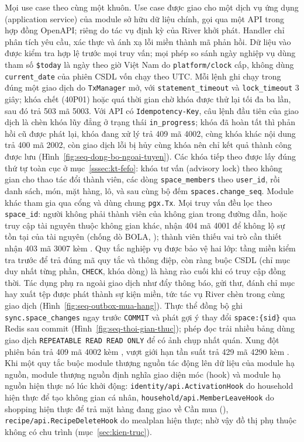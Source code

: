 Mọi use case theo cùng một khuôn. Use case được giao cho một dịch vụ ứng dụng (application service) của module sở hữu dữ liệu chính, gọi qua một API trong hợp đồng OpenAPI; riêng  do tác vụ định kỳ của River khởi phát. Handler chỉ phân tích yêu cầu, xác thực và ánh xạ lỗi miền thành mã phản hồi. Dữ liệu vào được kiểm tra hợp lệ trước mọi truy vấn; mọi phép so sánh ngày nghiệp vụ dùng tham số \texttt{\$today} là ngày theo giờ Việt Nam do \texttt{platform/clock} cấp, không dùng \texttt{current\_date} của phiên CSDL vốn chạy theo UTC. Mỗi lệnh ghi chạy trong đúng một giao dịch do \texttt{TxManager} mở, với \texttt{statement\_timeout} và \texttt{lock\_timeout} 3 giây; khóa chết (40P01) hoặc quá thời gian chờ khóa được thử lại tối đa ba lần, sau đó trả 503 mã 5003. Với API có \texttt{Idempotency-Key}, câu lệnh đầu tiên của giao dịch là chèn khóa lũy đẳng ở trạng thái \texttt{in\_progress}; khóa đã hoàn tất thì phản hồi cũ được phát lại, khóa đang xử lý trả 409 mã 4002, cùng khóa khác nội dung trả 400 mã 2002, còn giao dịch lỗi bị hủy cùng khóa nên chỉ kết quả thành công được lưu (Hình~\ref{fig:seq-dong-bo-ngoai-tuyen}). Các khóa tiếp theo được lấy đúng thứ tự toàn cục ở mục~\ref{sssec:kt-fefo}: khóa tư vấn (advisory lock) theo không gian cho thao tác đổi thành viên, các dòng \texttt{space\_members} theo \texttt{user\_id}, rồi danh sách, món, mặt hàng, lô, và sau cùng bộ đếm \texttt{spaces.change\_seq}. Module khác tham gia qua cổng và dùng chung \texttt{pgx.Tx}. Mọi truy vấn đều lọc theo \texttt{space\_id}: người không phải thành viên của không gian trong đường dẫn, hoặc truy cập tài nguyên thuộc không gian khác, nhận 404 mã 4001 để không lộ sự tồn tại của tài nguyên (chống dò BOLA, ); thành viên thiếu vai trò cần thiết nhận 403 mã 3007 kèm . Quy tắc nghiệp vụ được bảo vệ hai lớp: tầng miền kiểm tra trước để trả đúng mã quy tắc và thông điệp, còn ràng buộc CSDL (chỉ mục duy nhất từng phần, \texttt{CHECK}, khóa dòng) là hàng rào cuối khi có truy cập đồng thời. Tác dụng phụ ra ngoài giao dịch như đẩy thông báo, gửi thư, đánh chỉ mục hay xuất tệp được phát thành sự kiện miền, tức tác vụ River chèn trong cùng giao dịch (Hình~\ref{fig:seq-outbox-mua-hang}). Thực thể đồng bộ ghi \texttt{sync.space\_changes} ngay trước \texttt{COMMIT} và phát gợi ý thay đổi \texttt{space:\{sid\}} qua Redis sau commit (Hình~\ref{fig:seq-thoi-gian-thuc}); phép đọc trải nhiều bảng dùng giao dịch \texttt{REPEATABLE READ READ ONLY} để có ảnh chụp nhất quán. Xung đột phiên bản trả 409 mã 4002 kèm , vượt giới hạn tần suất trả 429 mã 4290 kèm . Khi một quy tắc buộc module thượng nguồn tác động lên dữ liệu của module hạ nguồn, module thượng nguồn định nghĩa giao diện móc (hook) và module hạ nguồn hiện thực nó lúc khởi động: \texttt{identity/api.ActivationHook} do household hiện thực để tạo không gian cá nhân, \texttt{household/api.MemberLeaveHook} do shopping hiện thực để trả mặt hàng đang giao về Cần mua (), \texttt{recipe/api.RecipeDeleteHook} do mealplan hiện thực; nhờ vậy đồ thị phụ thuộc không có chu trình (mục~\ref{sec:kien-truc}).

